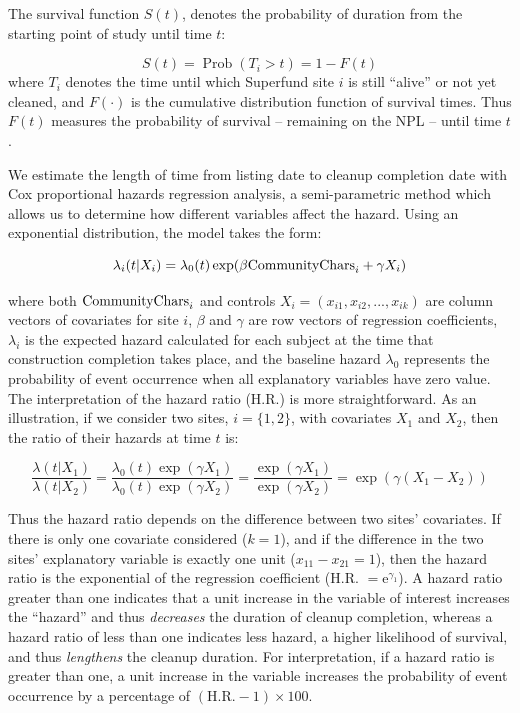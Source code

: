 \documentclass[12pt]{article}
\newcommand{\e}{\mathrm{e}}
\begin{document}
{The survival function $S(t)$, denotes the probability of duration from the starting point of study until time $t$: 

\begin{equation}
S(t)=\operatorname{Prob}(T_i>t)=1-F(t)  \label{surv}
\end{equation}
where $T_i$ denotes the time until which Superfund site $i$ is still ``alive'' or not yet cleaned, and $F(\cdot)$ is the cumulative distribution function of survival times. Thus $F(t)$ measures the probability of survival -- remaining on the NPL -- until time $t$.

We estimate the length of time from listing date to cleanup completion date with Cox proportional hazards regression analysis, a semi-parametric method which allows us to determine how different variables affect the hazard. 
Using an exponential distribution, the model takes the form:

\begin{equation}
\lambda_{i}(t|X_{i}) =\lambda_{0}(t)\exp(\beta \mathrm{CommunityChars}_i + \gamma X_{i}) \label{PH1}
\end{equation}

where both $\mathrm{CommunityChars}_i$ and controls $X_{i}=(x_{i1}, x_{i2},..., x_{ik})$ are column vectors of covariates for site $i$, $\beta$ and $\gamma$ are row vectors of regression coefficients, $\lambda_{i}$ is the expected hazard calculated for each subject at the time that construction completion takes place, and the baseline hazard $\lambda_{0}$ represents the probability of event occurrence when all explanatory variables have zero value. The interpretation of the hazard ratio (H.R.) is more straightforward. As an illustration, if we consider two sites, $i = \{1, 2\}$, with covariates $X_{1}$ and $X_{2}$, then the ratio of their hazards at time $t$ is:

\begin{equation}
\frac{\lambda(t|X_{1})}{\lambda(t|X_{2})}=\frac{\lambda_{0}(t) \exp(\gamma X_{1})}{\lambda_{0}(t) \exp(\gamma X_{2})}=\frac{\exp(\gamma X_{1})}{\exp(\gamma X_{2})}=\exp(\gamma(X_{1}-X_{2}))
\end{equation}

Thus the hazard ratio depends on the difference between two sites' covariates. If there is only one covariate considered ($k=1$), and if the difference in the two sites' explanatory variable is exactly one unit ($x_{11}- x_{21}=1$), then the hazard ratio is the exponential of the regression coefficient (H.R. $= \e^{\gamma_1}$). A hazard ratio greater than one indicates that a unit increase in the variable of interest increases the ``hazard'' and thus \emph{decreases} the duration of cleanup completion, whereas a hazard ratio of less than one indicates less hazard, a higher likelihood of survival, and thus \emph{lengthens} the cleanup duration. For interpretation, if a hazard ratio is greater than one, a unit increase in the variable increases the probability of event occurrence by a percentage of $(\mathrm{H.R.}-1)\times100$. 

}
\end{document}
